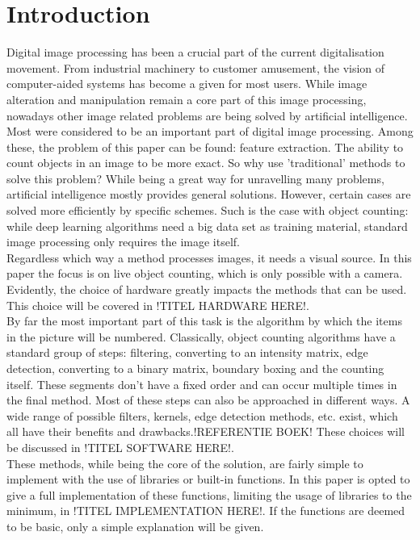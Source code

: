 \documentclass[11pt]{article}
\begin{document}




\newpage
\tableofcontents
\thispagestyle{empty}


\newpage
\listoffigures
\thispagestyle{empty}

\newpage
\section{Introduction}
Digital image processing has been a crucial part of the current digitalisation movement. From industrial machinery to customer amusement, the vision of computer-aided systems has become a given for most users. While image alteration and manipulation remain a core part of this image processing, nowadays other image related problems are being solved by artificial intelligence. Most were considered to be an important part of digital image processing. Among these, the problem of this paper can be found: feature extraction. The ability to count objects in an image to be more exact. So why use 'traditional' methods to solve this problem? While being a great way for unravelling many problems, artificial intelligence mostly provides general solutions. However, certain cases are solved more efficiently by specific schemes. Such is the case with object counting: while deep learning algorithms need a big data set as training material, standard image processing only requires the image itself.\\
Regardless which way a method processes images, it needs a visual source. In this paper the focus is on live object counting, which is only possible with a camera. Evidently, the choice of hardware greatly impacts the methods that can be used. This choice will be covered in !TITEL HARDWARE HERE!.\\
By far the most important part of this task is the algorithm by which the items in the picture will be numbered. Classically, object counting algorithms have a standard group of steps: filtering, converting to an intensity matrix, edge detection, converting to a binary matrix, boundary boxing and the counting itself. These segments don't have a fixed order and can occur multiple times in the final method. Most of these steps can also be approached in different ways. A wide range of possible filters, kernels, edge detection methods, etc. exist, which all have their benefits and drawbacks.!REFERENTIE BOEK! These choices will be discussed in !TITEL SOFTWARE HERE!.\\
These methods, while being the core of the solution, are fairly simple to implement with the use of libraries or built-in functions. In this paper is opted to give a full implementation of these functions, limiting the usage of libraries to the minimum, in !TITEL IMPLEMENTATION HERE!. If the functions are deemed to be basic, only a simple explanation will be given.
\end{document}
